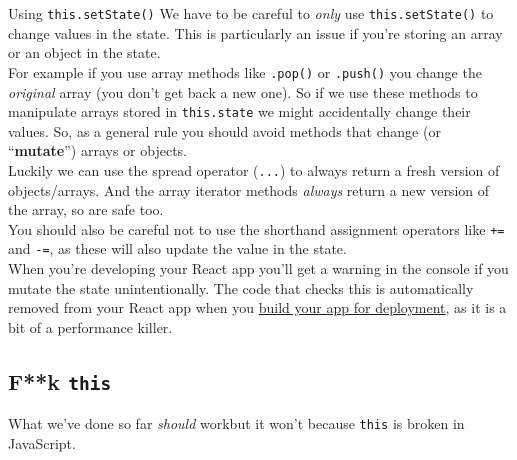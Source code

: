 \begin{infobox}{Using \texttt{this.setState()}}
    We have to be careful to \textit{only} use \texttt{this.setState()} to change values in the state. This is particularly an issue if you're storing an array or an object in the state.
    \\

    For example if you use array methods like \texttt{.pop()} or \texttt{.push()} you change the \textit{original} array (you don't get back a new one). So if we use these methods to manipulate arrays stored in \texttt{this.state} we might accidentally change their values. So, as a general rule you should avoid methods that change (or ``\textbf{mutate}'') arrays or objects.
    \\

    Luckily we can use the spread operator (\texttt{...}) to always return a fresh version of objects/arrays. And the array iterator methods \textit{always} return a new version of the array, so are safe too.
    \\

    You should also be careful not to use the shorthand assignment operators like \texttt{+=} and \texttt{-=}, as these will also update the value in the state.
    \\

    When you're developing your React app you'll get a warning in the console if you mutate the state unintentionally. The code that checks this is automatically removed from your React app when you \hyperref[deployment]{build your app for deployment}, as it is a bit of a performance killer.
\end{infobox}


\pagebreak


\subsection{F**k \texttt{this}}



What we've done so far \textit{should} work\textellipsis{ }but it won't because \texttt{this} is broken in JavaScript.
\\

